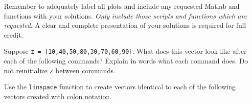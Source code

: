 \documentclass[12pt]{exam}
\begin{document}
Remember to adequately label all plots and include any requested Matlab and functions with your solutions. \emph{Only include those scripts and functions which are requested}. A clear and complete presentation of your solutions is required for full credit.
\begin{questions}

\question Suppose \verb$z = [10,40,50,80,30,70,60,90]$. What does this vector look like after each of the following commands? Explain in words what each command does. Do not reinitialize \verb$z$ between commands.


\question Use the \verb$linspace$ function to create vectors identical to each of the following vectors created with colon notation.



\end{questions}
\end{document}
